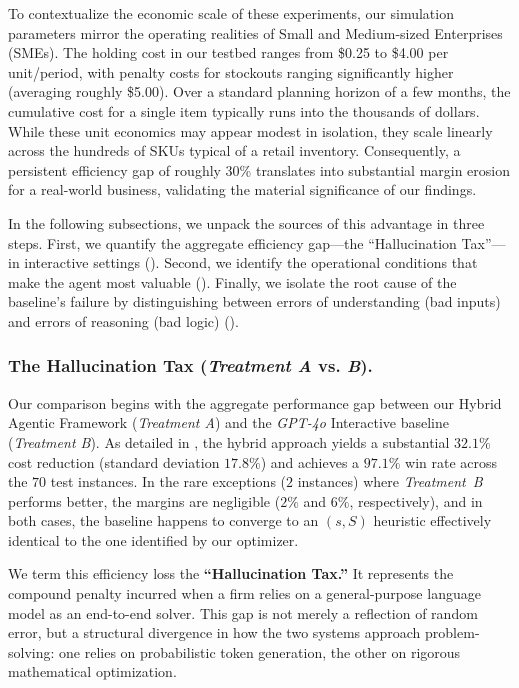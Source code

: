 To contextualize the economic scale of these experiments, our simulation parameters mirror the operating realities of Small and Medium-sized Enterprises (SMEs). The holding cost in our testbed ranges from \$0.25 to \$4.00 per unit/period, with penalty costs for stockouts ranging significantly higher (averaging roughly \$5.00). Over a standard planning horizon of a few months, the cumulative cost for a single item typically runs into the thousands of dollars. While these unit economics may appear modest in isolation, they scale linearly across the hundreds of SKUs typical of a retail inventory. Consequently, a persistent efficiency gap of roughly 30\% translates into substantial margin erosion for a real-world business, validating the material significance of our findings.



{In the following subsections, we unpack the sources of this advantage in three steps. First, we quantify the aggregate efficiency gap—the ``Hallucination Tax''—in interactive settings (). Second, we identify the operational conditions that make the agent most valuable (). Finally, we isolate the root cause of the baseline's failure by distinguishing between errors of understanding (bad inputs) and errors of reasoning (bad logic) ().}



\subsubsection{The Hallucination Tax (\emph{Treatment A} vs. \emph{B}).}
\label{sec:hallucination_tax}



Our comparison begins with the aggregate performance gap between our Hybrid Agentic Framework (\emph{Treatment A}) and the \emph{GPT-4o} Interactive baseline (\emph{Treatment B}). As detailed in , the hybrid approach yields a substantial $\mathbf{32.1\%}$ cost reduction (standard deviation $17.8\%$) and achieves a $97.1\%$ win rate across the $70$ test instances. In the rare exceptions ($2$ instances) where \emph{Treatment~B} performs better, the margins are negligible ($2\%$ and $6\%$, respectively), and in both cases, the baseline happens to converge to an $(s, S)$ heuristic effectively identical to the one identified by our optimizer.

We term this efficiency loss the \textbf{``Hallucination Tax.''} It represents the compound penalty incurred when a firm relies on a general-purpose language model as an end-to-end solver. This gap is not merely a reflection of random error, but a structural divergence in how the two systems approach problem-solving: one relies on probabilistic token generation, the other on rigorous mathematical optimization.

